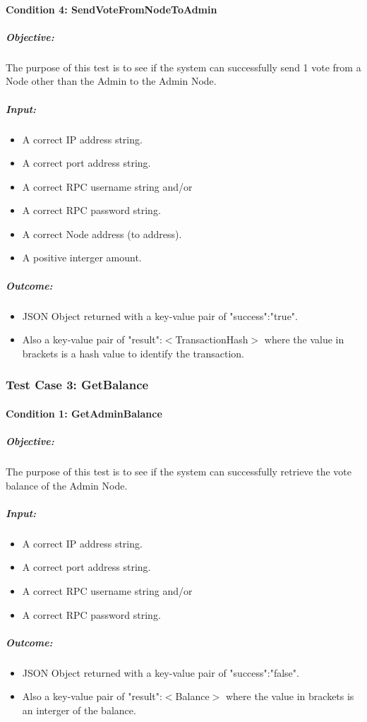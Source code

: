 \documentclass[11pt]{article}
\begin{document}
	\paragraph{Condition 4: SendVoteFromNodeToAdmin}	
	\subparagraph{Objective:}
	The purpose of this test is to see if the system can successfully send 1 vote from a Node other than the Admin to the Admin Node.
	\subparagraph{Input:}
	\begin{itemize}
		\item A correct IP address string.
		\item A correct port address string.
		\item A correct RPC username string and/or
		\item A correct RPC password string.
		\item A correct Node address (to address).
		\item A positive interger amount.
	\end{itemize}
	\subparagraph{Outcome:}
	\begin{itemize}
		\item JSON Object returned with a key-value pair of "success":"true".
		\item Also a key-value pair of "result":$<$TransactionHash$>$ where the value in brackets is a hash value to identify the transaction.
	\end{itemize}
	
	\subsubsection{Test Case 3: GetBalance}
	\paragraph{Condition 1: GetAdminBalance}	
	\subparagraph{Objective:}
	The purpose of this test is to see if the system can successfully retrieve the vote balance of the Admin Node.
	\subparagraph{Input:}
	\begin{itemize}
		\item A correct IP address string.
		\item A correct port address string.
		\item A correct RPC username string and/or
		\item A correct RPC password string.
	\end{itemize}
	\subparagraph{Outcome:}
	\begin{itemize}
		\item JSON Object returned with a key-value pair of "success":"false".
		\item Also a key-value pair of "result":$<$Balance$>$ where the value in brackets is an interger of the balance.
	\end{itemize}
	
\end{document}

